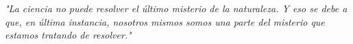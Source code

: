 \begin{dedication}
    \begin{flushright}
        \singlespacing\textit{"La ciencia no puede resolver el último misterio de la naturaleza. 
        Y eso se debe a que, en última instancia, nosotros mismos somos una parte 
        del misterio que estamos tratando de resolver."}\\
    \end{flushright}
\end{dedication}